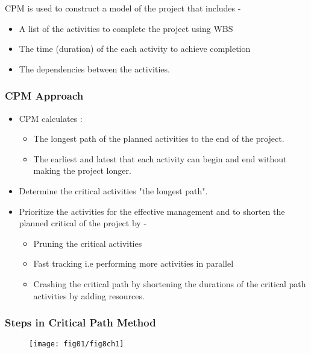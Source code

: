 CPM is used to construct a model of the project that includes -
\begin{itemize}
	\item A list of the activities to complete the project using WBS
		\item The time (duration) of the each activity to achieve completion 
			\item The dependencies between the activities.
\end{itemize}






\subsubsection{CPM Approach\cite{CPM}} 

\begin{itemize}
	\item CPM calculates :
	\begin{itemize}
		\item The longest path of the planned activities to the end of the project.
		\item The earliest and latest that each activity can begin and end without making the project longer.
	\end{itemize}
		\item Determine the critical activities "the longest path".
		\item Prioritize the activities for the effective management and to shorten the planned critical of the project by -
		\begin{itemize}
			\item Pruning the critical activities 
				\item Fast tracking i.e performing more activities in parallel 
			\item Crashing the critical path by shortening the durations of the critical path activities by adding resources. 
		\end{itemize}
\end{itemize}



\subsubsection{Steps in Critical Path Method }

\begin{figure}
	\centering
	\texttt{[image: fig01/fig8ch1]}
\end{figure}



